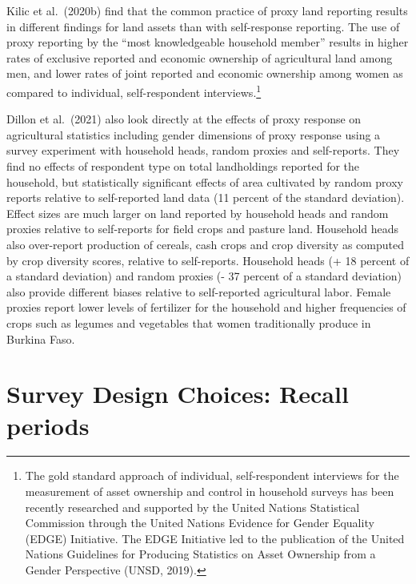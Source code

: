 \documentclass[
]{book}
\begin{document}
Kilic et al.~(2020b) find that the common practice of proxy land reporting results in different findings for land assets than with self-response reporting. The use of proxy reporting by the ``most knowledgeable household member'' results in higher rates of exclusive reported and economic ownership of agricultural land among men, and lower rates of joint reported and economic ownership among women as compared to individual, self-respondent interviews.\footnote{The gold standard approach of individual, self-respondent interviews for the measurement of asset ownership and control in household surveys has been recently researched and supported by the United Nations Statistical Commission through the United Nations Evidence for Gender Equality (EDGE) Initiative. The EDGE Initiative led to the publication of the United Nations Guidelines for Producing Statistics on Asset Ownership from a Gender Perspective (UNSD, 2019).}

Dillon et al.~(2021) also look directly at the effects of proxy response on agricultural statistics including gender dimensions of proxy response using a survey experiment with household heads, random proxies and self-reports. They find no effects of respondent type on total landholdings reported for the household, but statistically significant effects of area cultivated by random proxy reports relative to self-reported land data (11 percent of the standard deviation). Effect sizes are much larger on land reported by household heads and random proxies relative to self-reports for field crops and pasture land. Household heads also over-report production of cereals, cash crops and crop diversity as computed by crop diversity scores, relative to self-reports. Household heads (+ 18 percent of a standard deviation) and random proxies (- 37 percent of a standard deviation) also provide different biases relative to self-reported agricultural labor. Female proxies report lower levels of fertilizer for the household and higher frequencies of crops such as legumes and vegetables that women traditionally produce in Burkina Faso.

\hypertarget{survey-design-choices-recall-periods}{%
\section{Survey Design Choices: Recall periods}\label{survey-design-choices-recall-periods}}
\end{document}
